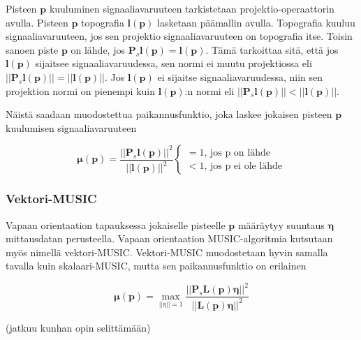 Pisteen $\mathbf{p}$ kuuluminen signaaliavaruuteen tarkistetaan projektio-operaattorin avulla. Pisteen $\mathbf{p}$ topografia $\mathbf{l(p)}$ lasketaan päämallin avulla. Topografia kuuluu signaaliavaruuteen, jos sen projektio signaaliavaruuteen on topografia itse. Toisin sanoen piste $\mathbf{p}$ on lähde, jos $\mathbf{P}_s\mathbf{l(p)} = \mathbf{l(p)}$. Tämä tarkoittaa sitä, että jos $\mathbf{l(p)}$ sijaitsee signaaliavaruudessa, sen normi ei muutu projektiossa eli $||\mathbf{P}_s\mathbf{l(p)}||=||\mathbf{l(p)}||$. Jos $\mathbf{l(p)}$ ei sijaitse signaaliavaruudessa, niin sen projektion normi on pienempi kuin $\mathbf{l(p)}$:n normi eli
$||\mathbf{P}_s\mathbf{l(p)}||<||\mathbf{l(p)}||$.

Näistä saadaan muodostettua paikannusfunktio, joka laskee jokaisen pisteen $\mathbf{p}$ kuulumisen signaaliavaruuteen

\begin{equation}
    \mathbf{\mu(p)} = \frac{||\mathbf{P}_s\mathbf{l(p)}||^2}{||\mathbf{l(p)}||^2} 
    \begin{cases}
    =1\text{, jos p on lähde}\\
    <1\text{, jos p ei ole lähde}
     \end{cases}
\end{equation}

\subsubsection{Vektori-MUSIC}
Vapaan orientaation tapauksessa jokaiselle pisteelle $\mathbf{p}$ määräytyy suuntaus $\mathbf{\eta}$ mittausdatan perusteella. Vapaan orientaation MUSIC-algoritmia kutsutaan myös nimellä vektori-MUSIC. Vektori-MUSIC muodostetaan hyvin samalla tavalla kuin skalaari-MUSIC, mutta sen paikannusfunktio on erilainen

\begin{equation}
    \mathbf{\mu(p)} = \max_{||\eta||=1} \frac{||\mathbf{P}_s\mathbf{L(p)\eta}||^2}{||\mathbf{L(p)\eta}||^2}
\end{equation}

(jatkuu kunhan opin selittämään)

